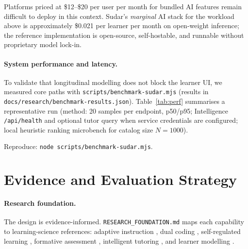 \documentclass[10pt,twocolumn]{article}
\begin{document}
Platforms priced at \$12--\$20 per user per month for bundled AI features
remain difficult to deploy in this context. Sudar's \emph{marginal} AI
stack for the workload above is approximately \$0.021 per learner per
month on open-weight inference; the reference implementation is
open-source, self-hostable, and runnable without proprietary model lock-in.

\paragraph{System performance and latency.}
\label{sec:perf}
To validate that longitudinal modelling does not block the learner UI,
we measured core paths with \texttt{scripts/benchmark-sudar.mjs}
(results in \texttt{docs/research/benchmark-results.json}).
Table~\ref{tab:perf} summarises a representative run (method: 20 samples
per endpoint, p50/p95; Intelligence \texttt{/api/health} and optional
tutor query when service credentials are configured; local heuristic
ranking microbench for catalog size $N{=}1000$).

\begin{table}[H]
\centering
\caption{Baseline latency (artefact: \texttt{benchmark-results.json}). Health/tutor
rows require a live Intelligence URL and service secret.}
\label{tab:perf}
\scriptsize
\setlength{\tabcolsep}{4pt}
\end{table}
\noindent\scriptsize{Reproduce: \texttt{node scripts/benchmark-sudar.mjs}.}

\section{Evidence and Evaluation Strategy}
\label{sec:eval}

\paragraph{Research foundation.}
The design is evidence-informed. \texttt{RESEARCH\_FOUNDATION.md}
maps each capability to learning-science references: adaptive
instruction \cite{vanlehn2011,aleven2016}, dual coding
\cite{mayer2009,clark2016}, self-regulated learning
\cite{zimmerman2002}, formative assessment \cite{black1998,roediger2006},
intelligent tutoring \cite{self1988,vanlehn2011}, and learner
modelling \cite{bull2016,self1988}.
\end{document}
